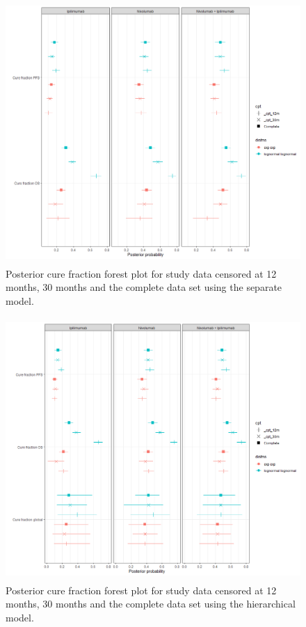\documentclass[AMA,STIX1COL]{WileyNJD-v2}
\begin{document}
\begin{figure}[!H]
\centering
\includegraphics[height=10cm, width=0.6\linewidth]{forest_plot_cf_sep_cpt.png}
\caption{\label{fig:forest_plot_cf_cutpoint_sep} Posterior cure fraction forest plot for study data censored at 12 months, 30 months and the complete data set using the separate model.}
\end{figure}

\begin{figure}[!H]
\centering
\includegraphics[height=10cm, width=0.6\linewidth]{forest_plot_cf_hier_cpt.png}
\caption{\label{fig:forest_plot_cf_cutpoint_hier} Posterior cure fraction forest plot for study data censored at 12 months, 30 months and the complete data set using the hierarchical model.}
\end{figure}
\end{document}
